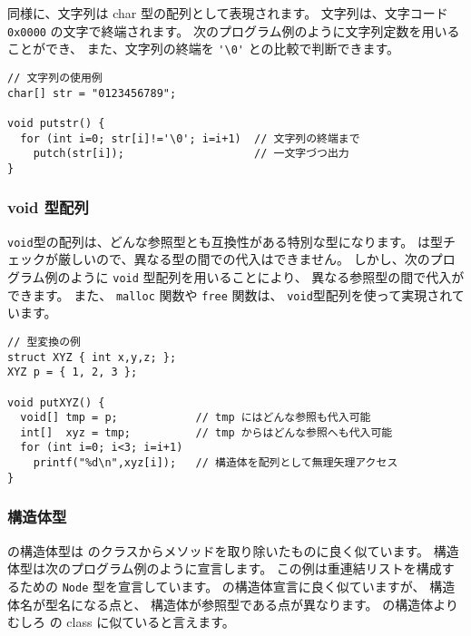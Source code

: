 \cl 同様に、文字列は char 型の配列として表現されます。
文字列は、文字コード \verb/0x0000/ の文字で終端されます。
次のプログラム例のように文字列定数を用いることができ、
また、文字列の終端を \verb/'\0'/ との比較で判断できます。

\begin{mylist}
\begin{verbatim}
// 文字列の使用例
char[] str = "0123456789";

void putstr() {
  for (int i=0; str[i]!='\0'; i=i+1)  // 文字列の終端まで
    putch(str[i]);                    // 一文字づつ出力
}
\end{verbatim}
\end{mylist}

\subsubsection{ void 型配列}

\verb/void/型の配列は、どんな参照型とも互換性がある特別な型になります。
\cmml は型チェックが厳しいので、異なる型の間での代入はできません。
しかし、次のプログラム例のように \verb/void/ 型配列を用いることにより、
異なる参照型の間で代入ができます。
また、 \verb/malloc/ 関数や \verb/free/ 関数は、
\verb/void/型配列を使って実現されています。

\begin{mylist}
\begin{verbatim}
// 型変換の例
struct XYZ { int x,y,z; };
XYZ p = { 1, 2, 3 };

void putXYZ() {
  void[] tmp = p;            // tmp にはどんな参照も代入可能
  int[]  xyz = tmp;          // tmp からはどんな参照へも代入可能
  for (int i=0; i<3; i=i+1)
    printf("%d\n",xyz[i]);   // 構造体を配列として無理矢理アクセス
}
\end{verbatim}
\end{mylist}

\subsubsection{構造体型}

\label{chap3:struct}
\cmml の構造体型は \javal のクラスからメソッドを取り除いたものに良く似ています。
構造体型は次のプログラム例のように宣言します。
この例は重連結リストを構成するための \verb/Node/ 型を宣言しています。
\cl の構造体宣言に良く似ていますが、
構造体名が型名になる点と、
構造体が参照型である点が異なります。
\cl の構造体よりむしろ \javal の class に似ていると言えます。

